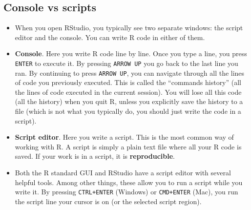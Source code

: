 \documentclass[
]{book}
\providecommand{\tightlist}{%
  \setlength{\itemsep}{0pt}\setlength{\parskip}{0pt}}
\begin{document}
\hypertarget{console-vs-scripts}{%
\subsection{Console vs scripts}\label{console-vs-scripts}}

\begin{itemize}
\tightlist
\item
  When you open RStudio, you typically see two separate windows: the script editor and the console. You can write R code in either of them.
\item
  \textbf{Console}. Here you write R code line by line. Once you type a line, you press \texttt{ENTER} to execute it. By pressing \texttt{ARROW\ UP} you go back to the last line you ran. By continuing to press \texttt{ARROW\ UP}, you can navigate through all the lines of code you previously executed. This is called the ``commands history'' (all the lines of code executed in the current session). You will lose all this code (all the history) when you quit R, unless you explicitly save the history to a file (which is not what you typically do, you should just write the code in a script).\\
\item
  \textbf{Script editor}. Here you write a script. This is the most common way of working with R. A script is simply a plain text file where all your R code is saved. If your work is in a script, it is \textbf{reproducible}.
\item
  Both the R standard GUI and RStudio have a script editor with several helpful tools. Among other things, these allow you to run a script while you write it. By pressing \texttt{CTRL+ENTER} (Windows) or \texttt{CMD+ENTER} (Mac), you run the script line your cursor is on (or the selected script region).


\end{itemize}
\end{document}
